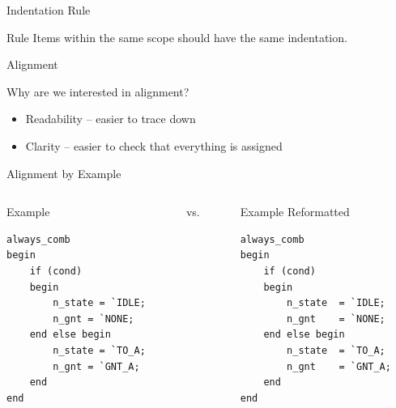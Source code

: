 \documentclass[dvipsnames]{beamer}
\begin{document}
\begin{frame}{Indentation Rule}
	\begin{block}{Rule}
		Items within the same scope should have the same indentation.
	\end{block}
\end{frame}

\begin{frame}{Alignment}
	\begin{block}{Why are we interested in alignment?}
		\begin{itemize}
			\item Readability -- easier to trace down
			\item Clarity -- easier to check that everything is assigned
		\end{itemize}
	\end{block}
\end{frame}

\begin{frame}[fragile]{Alignment by Example}
	\begin{columns}
		\begin{column}[T]{0.35\textwidth}
		\begin{block}{Example}
			\vspace*{0pt}
			\begin{verbatim}
always_comb
begin
    if (cond)
    begin
        n_state = `IDLE;
        n_gnt = `NONE;
    end else begin
        n_state = `TO_A;
        n_gnt = `GNT_A;
    end
end
			\end{verbatim}
		\end{block}
		\end{column}
		\pause
		\begin{column}[T]{0.1\textwidth}
			\vspace*{0.3\textheight}
			\large{vs.}
			\normalsize
		\end{column}
		\begin{column}[T]{0.35\textwidth}
		\begin{block}{Example Reformatted}
			\vspace*{0pt}
			\begin{verbatim}
always_comb
begin
    if (cond)
    begin
        n_state  = `IDLE;
        n_gnt    = `NONE;
    end else begin
        n_state  = `TO_A;
        n_gnt    = `GNT_A;
    end
end
			\end{verbatim}
		\end{block}
		\end{column}
	\end{columns}
\end{frame}
\end{document}
